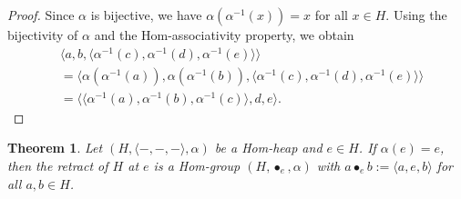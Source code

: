 \documentclass[14pt]{article}
\newtheorem{thm}{Theorem}[section]
\theoremstyle{Definition}
\theoremstyle{remark}
\begin{document}
\begin{proof}
Since $\alpha$ is bijective, we have $\alpha(\alpha^{-1}(x)) = x$ for all $x \in H$.  
Using the bijectivity of $\alpha$ and the Hom-associativity property, we obtain
\begin{align*}
&\langle a, b, \langle \alpha^{-1}(c), \alpha^{-1}(d), \alpha^{-1}(e) \rangle \rangle \\
&= \langle \alpha(\alpha^{-1}(a)), \alpha(\alpha^{-1}(b)), \langle \alpha^{-1}(c), \alpha^{-1}(d), \alpha^{-1}(e) \rangle \rangle \\
&= \langle \langle \alpha^{-1}(a), \alpha^{-1}(b), \alpha^{-1}(c) \rangle, d, e \rangle.
\end{align*}
\end{proof}
\begin{thm}\label{hinv}
Let $(H,\langle -,-,-\rangle,\alpha)$ be a Hom-heap and $e\in H$. If $\alpha(e)=e$, then the retract of $H$ at $e$ is a Hom-group $(H,\bullet_{e},\alpha)$ with $a\bullet_{e}b:=\langle a,e,b\rangle$ for all $a,b\in H$.
\end{thm}
\end{document}
